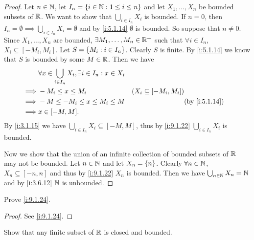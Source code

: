 \begin{proof}
  Let \(n \in \mathbb{N}\), let \(I_n = \left\lbrace i \in \mathbb{N} : 1 \leq i \leq n\right\rbrace\) and let \(X_1, \dots, X_n\) be bounded subsets of \(\mathbb{R}\).
  We want to show that \(\bigcup_{i \in I_n} X_i\) is bounded.
  If \(n = 0\), then \(I_n = \emptyset \implies \bigcup_{i \in I_n} X_i = \emptyset\) and by \cref{i:5.1.14} \(\emptyset\) is bounded.
  So suppose that \(n \neq 0\).
  Since \(X_1, \dots, X_n\) are bounded, \(\exists M_1, \dots, M_n \in \mathbb{R}^+\) such that \(\forall i \in I_n\), \(X_i \subseteq [-M_i, M_i]\).
  Let \(S = \left\lbrace M_i : i \in I_n\right\rbrace\).
  Clearly \(S\) is finite.
  By \cref{i:5.1.14} we know that \(S\) is bounded by some \(M \in \mathbb{R}\).
  Then we have
  \begin{align*}
             & \forall x \in \bigcup_{i \in I_n} X_i, \exists i \in I_n : x \in X_i                                               \\
    \implies & -M_i \leq x \leq M_i                                                 & (X_i \subseteq [-M_i, M_i])                 \\
    \implies & -M \leq -M_i \leq x \leq M_i \leq M                                  &                             & \by{i:5.1.14} \\
    \implies & x \in [-M, M].
  \end{align*}
  By \cref{i:3.1.15} we have \(\bigcup_{i \in I_n} X_i \subseteq [-M, M]\), thus by \cref{i:9.1.22} \(\bigcup_{i \in I_n} X_i\) is bounded.

  Now we show that the union of an infinite collection of bounded subsets of \(\mathbb{R}\) may not be bounded.
  Let \(n \in \mathbb{N}\) and let \(X_n = \left\lbrace n\right\rbrace\).
  Clearly \(\forall n \in \mathbb{N}\), \(X_n \subseteq [-n, n]\) and thus by \cref{i:9.1.22} \(X_n\) is bounded.
  Then we have \(\bigcup_{n \in \mathbb{N}} X_n = \mathbb{N}\) and by \cref{i:3.6.12} \(\mathbb{N}\) is unbounded.
\end{proof}

\begin{ex}\label{i:ex:9.1.13}
  Prove \cref{i:9.1.24}.
\end{ex}

\begin{proof}
  See \cref{i:9.1.24}.
\end{proof}

\begin{ex}\label{i:ex:9.1.14}
  Show that any finite subset of \(\mathbb{R}\) is closed and bounded.
\end{ex}

